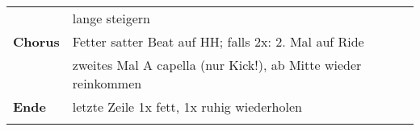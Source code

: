 \begin{tabular}{p{1.6cm}l}
                    & lange steigern                                                           \\
    \textbf{Chorus} & Fetter satter Beat auf HH; falls 2x: 2. Mal auf Ride                     \\
                    & zweites Mal A capella (nur Kick!), ab Mitte wieder reinkommen            \\
    \textbf{Ende}   & letzte Zeile 1x fett, 1x ruhig wiederholen                               \\
                    &                                                                          \\
\end{tabular}
